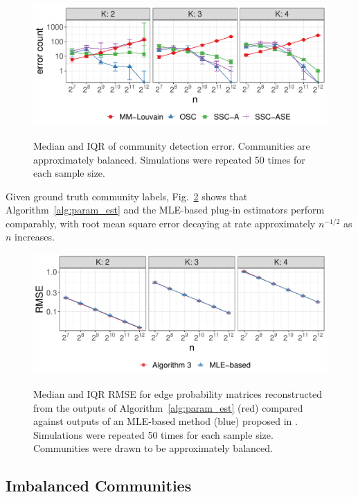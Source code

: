 \documentclass[12pt]{article}
\begin{document}
\begin{figure}[tp]
{\centering \includegraphics{summary_files/figure-latex/clust_err_ct_sim-1}
}

\caption{Median and IQR of community detection error. Communities are approximately balanced. Simulations were repeated 50 times for each sample size.}\label{fig:clust_err_ct_sim}
\end{figure}

Given ground truth community labels, Fig.~\ref{fig:p_block_est} shows
that Algorithm~\ref{alg:param_est} and the MLE-based
plug-in estimators perform comparably, with root mean square
error decaying at rate approximately \(n^{-1/2}\) as $n$ increases.

\begin{figure}[tp]
{\centering \includegraphics{summary_files/figure-latex/lambda_est_p-1}}
\caption{Median and IQR RMSE for edge probability matrices
  reconstructed from the outputs of Algorithm~\ref{alg:param_est}
  (red) compared against outputs of an MLE-based method (blue) proposed in \citet{307cbeb9b1be48299388437423d94bf1}.
  Simulations were repeated 50 times for each sample size. Communities were drawn to be approximately balanced.}
\label{fig:p_block_est}
\end{figure}

\hypertarget{imbalanced-communities}{%
\subsection{Imbalanced Communities}\label{imbalanced-communities}}
\end{document}
